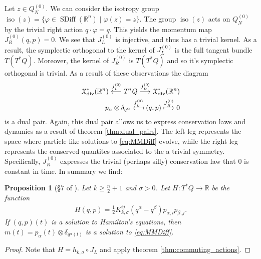 \documentclass[12pt]{amsart}
\newcommand{\R}{\ensuremath{\mathbb{R}}}
\newtheorem{prop}[thm]{Proposition}
\DeclareMathOperator{\SDiff}{SDiff}
\DeclareMathOperator{\iso}{iso}
\begin{document}
  Let $z \in Q_N^{(0)}$.
  We can consider the isotropy group $\iso(z) = \{ \varphi \in \SDiff(\R^n) \mid \varphi(z) = z \}$.  The group $\iso(z)$ acts on $Q_N^{(0)}$
  by the trivial right action $q \cdot \varphi = q$.
  This yields the momentum map $J_R^{(0)}(q,p) = 0$.
  We see that $J_L^{(0)}$ is injective, and thus has a trivial kernel.
  As a result, the symplectic orthogonal to the kernel of $J_L^{(0)}$
  is the full tangent bundle $T(T^*Q)$.
  Moreover, the kernel of $J_R^{(0)}$ is $T(T^*Q)$ and so it's symplectic
  orthogonal is trivial.
  As a result of these observations the diagram
  \begin{align*}
    \mathfrak{X}^*_{\rm div}(\R^n) \stackrel{J_L^{(0)} }{\longleftarrow}
    T^{\ast}Q
    \stackrel{J_R^{(0)} }{\longrightarrow} \mathfrak{X}^*_{\rm div}(\R^n) \\
    p_\alpha \otimes \delta_{q^\alpha} \stackrel{J_L^{(0)}}{\longmapsfrom}
    (q,p)
    \stackrel{J_R^{(0)} }{\longmapsto} 0
  \end{align*}
  is a dual pair.
  Again, this dual pair allows us to express conservation
  laws and dynamics as a result of theorem \ref{thm:dual_pairs}.
  The left leg represents the space where particle like
  solutions to \eqref{eq:MMDiff} evolve,
  while the right leg represents the conserved quantites
  associated to the a trivial symmetry.
  Specifically, $J_R^{(0)}$ expresses the trivial (perhaps silly)
  conservation law that $0$ is constant in time.
  In summary we find:
  \begin{prop}[\S7 of \cite{MumfordMichor2013}] \label{prop:0-solutions}
  Let $k \geq \frac{n}{2} +1$ and $\sigma > 0$.
  Let $H:T^*Q \to \R$ be the function
  \begin{align*}
    H(q,p) =\frac{1}{2} K_{k,\sigma}^{ij}(q^\alpha - q^\beta) p_{\alpha,i} p_{\beta,j}.
  \end{align*}
  If $(q,p)(t)$ is a solution to Hamilton's equations, then
  $m(t) = p_\alpha(t) \otimes \delta_{q^\alpha(t)}$
  is a solution to \eqref{eq:MMDiff}.
\end{prop}
\begin{proof}
	Note that $H = h_{k,\sigma} \circ J_L$ and apply theorem \ref{thm:commuting_actions}.
\end{proof}
\end{document}
